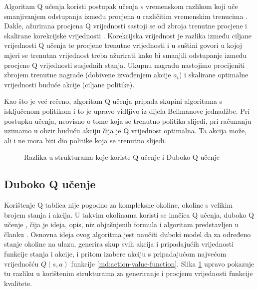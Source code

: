 Algoritam Q učenja koristi postupak učenja s vremenskom razlikom \cite{PodUceFer}  koji uče smanjivanjem odstupanja između procjena u različitim vremenskim trenucima \cite{BruntonYoutube}. Dakle, ažurirana procjena Q vrijednosti sastoji se od zbroja trenutne procjene i skalirane korekcijske vrijednosti . Korekcijska vrijednost je razlika između ciljane vrijednosti Q učenja  te procjene trenutne vrijednosti i u suštini govori u kojoj mjeri se trenutna vrijednost treba ažurirati kako bi smanjili odstupanje između procjene Q vrijednosti susjednih stanja. Ukupnu nagradu nastojimo procijeniti zbrojem trenutne nagrade (dobivene izvođenjem akcije $a_t$) i skalirane optimalne vrijednosti buduće akcije (ciljane politike). 

Kao što je već rečeno, algoritam Q učenja pripada skupini algoritama s isključenom politikom i to je upravo vidljivo iz dijela Bellmanove jednadžbe. Pri postupku učenja, neovisno o tome koja se trenutno politika slijedi, pri računanju uzimamo u obzir buduću akciju čija je Q vrijednost optimalna. Ta akcija može, ali i ne mora biti dio politike koja se trenutno slijedi. 

\begin{figure}[H]
    \centering
    \caption{Razlika u strukturama koje koriste Q učenje i Duboko Q učenje \cite{QLStructure}}
    \label{fig:q-learning}
\end{figure}

\subsection{Duboko Q učenje}

Korištenje Q tablica nije pogodno za kompleksne okoline, okoline s velikim brojem stanja i akcija. U takvim okolinama koristi se inačica Q učenja, duboko Q učenje , čija je ideja, opis, niz objašnjenih formula i algoritam predstavljen u članku \cite{DQL}. Osnovna ideja ovog algoritma jest naučiti duboki model da za određeno stanje okoline na ulazu, generira skup svih akcija i pripadajućih vrijednosti funkcije stanja i akcije, i pritom izabere akciju s pripadajućom najvećom vrijednošću $Q(s, a)$ funkcije \ref{md:action-value-function}. Slika \ref{fig:q-learning} upravo pokazuje tu razliku u korištenim strukturama za generiranje i procjenu vrijednosti funkcije kvalitete.

